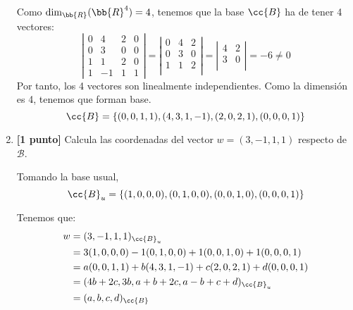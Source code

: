 \documentclass[12pt]{article}
\begin{document}
\begin{ejercicio}
\begin{enumerate}
        Como $\dim_{\bb{R}}(\bb{R}^4)=4$, tenemos que la base $\cc{B}$ ha de tener 4 vectores:
        \begin{equation*}
            \left|\begin{array}{cccc}
                0 & 4 & 2 & 0 \\
                0 & 3 & 0 & 0\\
                1 & 1 & 2 & 0\\
                1 & -1 & 1 & 1
            \end{array}\right| = \left|\begin{array}{ccc}
                0 & 4 & 2 \\
                0 & 3 & 0\\
                1 & 1 & 2\\
            \end{array}\right| = 
            \left|\begin{array}{ccc}
                4 & 2 \\
                3 & 0\\
            \end{array}\right| = -6 \neq 0
        \end{equation*}
        Por tanto, los 4 vectores son linealmente independientes. Como la dimensión es 4, tenemos que forman base.
        \begin{equation*}
            \cc{B} = \left\{(0,0,1,1),(4,3,1,-1), (2,0,2,1), (0,0,0,1)\right\}
        \end{equation*}
        
        \item \textbf{[1 punto]} Calcula las coordenadas del vector $w = (3, -1, 1, 1)$ respecto de $\mathcal{B}$.

        Tomando la base usual,
        \begin{equation*}
            \cc{B}_u=\left\{(1,0,0,0),(0,1,0,0),(0,0,1,0),(0,0,0,1)\right\}    
        \end{equation*}

        Tenemos que:
        \begin{equation*}\begin{split}
            w &= (3,-1,1,1)_{\cc{B}_u} \\
            &= 3(1,0,0,0) -1(0,1,0,0) +1(0,0,1,0) +1(0,0,0,1) \\
            &= a(0,0,1,1) +b(4,3,1,-1) +c(2,0,2,1) +d(0,0,0,1) \\
            &= (4b+2c, 3b, a+b+2c, a-b+c+d)_{\cc{B}_u} \\
            &= (a,b,c,d)_{\cc{B}}
        \end{split}\end{equation*}


\end{enumerate}
\end{ejercicio}
\end{document}
